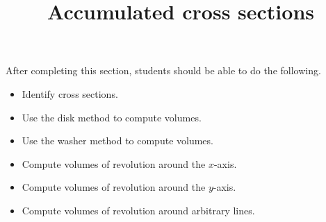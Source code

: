 \documentclass{ximera}
\title{Accumulated cross sections}
\begin{document}
\begin{abstract}
\end{abstract}

\maketitle

\begin{sectionOutcomes}

After completing this section, students should be able to do the following.

\begin{itemize}
\item Identify cross sections.
\item Use the disk method to compute volumes.
\item Use the washer method to compute volumes.
\item Compute volumes of revolution around the $x$-axis.
\item Compute volumes of revolution around the $y$-axis.
\item Compute volumes of revolution around arbitrary lines.
\end{itemize}

\end{sectionOutcomes}
\end{document}

